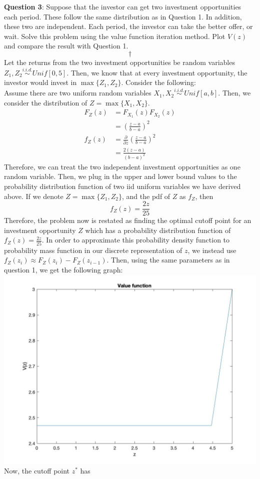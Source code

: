 \documentclass[
]{article}
\begin{document}
\textbf{Question 3}: Suppose that the investor can get two investment
opportunities each period. These follow the same distribution as in
Question 1. In addition, these two are independent. Each period, the
investor can take the better offer, or wait. Solve this problem using
the value function iteration method. Plot \(V (z)\) and compare the
result with Question 1. \[\dagger\] Let the returns from the two
investment opportunities be random variables
\(Z_1, Z_2 \stackrel{i.i.d.}{\sim} Unif[0, 5]\). Then, we know that at
every investment opportunity, the investor would invest in
\(\max\{Z_1, Z_2\}\). Consider the following:\\
\newline Assume there are two uniform random variables
\(X_1, X_2 \stackrel{i.i.d.}{\sim} Unif[a, b]\). Then, we consider the
distribution of \(Z = \max \{X_1, X_2\}\). \[\begin{aligned}
F_Z(z) &= F_{X_1}(z) F_{X_2}(z) \\
&= \left(\frac{z - a}{b - a}\right)^2 \\
f_Z(z) &= \frac{\partial}{\partial z} \left(\frac{z - a}{b - a}\right)^2 \\
&= \frac{2(z-a)}{(b-a)^2}
\end{aligned}\] \newline Therefore, we can treat the two independent
investment opportunities as one random variable. Then, we plug in the
upper and lower bound values to the probability distribution function of
two iid uniform variables we have derived above. If we denote
\(Z = \max\{Z_1, Z_2\}\), and the pdf of \(Z\) as \(f_Z\), then
\[f_Z(z) = \frac{2z}{25}\] Therefore, the problem now is restated as
finding the optimal cutoff point for an investment opportunity \(Z\)
which has a probability distribution function of
\(f_Z(z) = \frac{2z}{25}\). In order to approximate this probability
density function to probability mass function in our discrete
representation of \(z\), we instead use
\(f_Z(z_i) \approx F_Z(z_i) - F_Z(z_{i-1})\). Then, using the same
parameters as in question 1, we get the following graph:\\
\includegraphics{images/valfunc3.jpg} Now, the cutoff point \(z^*\) has
\end{document}
